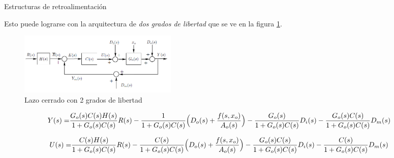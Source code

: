 \documentclass{beamer}
\begin{document}
\begin{frame}{Estructuras de retroalimentación}
\begin{justify}

{\footnotesize
Esto puede lograrse con la arquitectura de \textit{dos grados de libertad} que se ve en la figura \ref{2 grados de libertad}. 

\vspace{-0.3cm}
\begin{figure}[H]
    \centering
    \includegraphics[width=3in]{imagenes/lazo cerrado con 2 grados de libertad.PNG}
    \caption{Lazo cerrado con 2 grados de libertad}
    \label{2 grados de libertad}
\end{figure}
}

\vspace{-0.3cm}
{\tiny

\begin{align*}
Y(s)=& \frac{G_o(s)C(s)H(s)}{1+G_o(s)C(s)}R(s) - \frac{1}{1+G_o(s)C(s)}\Bigl(D_o(s)+\frac{f(s,x_o)}{A_o(s)} \Bigr)
 -\frac{G_o(s)}{1+G_o(s)C(s)}D_i(s)-\frac{G_o(s)C(s)}{1+G_o(s)C(s)}D_m(s)
\end{align*}

\begin{align*}
U(s)=& \frac{C(s)H(s)}{1+G_o(s)C(s)}R(s) - \frac{C(s)}{1+G_o(s)C(s)}\Bigl( D_o(s)+\frac{f(s,x_o)}{A_o(s)} \Bigr)
 -\frac{G_o(s)C(s)}{1+G_o(s)C(s)}D_i(s)-\frac{C(s)}{1+G_o(s)C(s)}D_m(s)
\end{align*}

}

\end{justify}
\end{frame}

\end{document}
